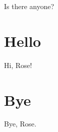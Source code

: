 \documentclass[10pt,a4paper]{article}
\begin{document}
	Is there anyone? 
	\section{Hello}
	Hi, Rose!
	\section{Bye}
	Bye, Rose.
\end{document}
